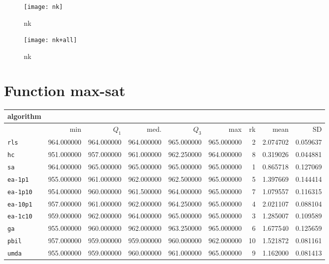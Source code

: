\begin{center}
\begin{figure}[h]
\centering
\texttt{[image: nk]}
\caption{nk}
\end{figure}
\end{center}

\begin{center}
\begin{figure}[h]
\centering
\texttt{[image: nk+all]}
\caption{nk}
\end{figure}
\end{center}

\newpage

\section{Function max-sat}
\begin{center}
\begin{tabular}{@{}l*{5}{>{{}}N{3}{0}}>{{}}N{2}{0}N{1}{3}N{1}{3}@{}}
\toprule
{algorithm} &  &  \\
\midrule
& {min} & {$Q_1$} & {med.} & {$Q_3$} & {max} & {rk} & {mean} & {SD} \\
\midrule
\verb|rls| & {\color{blue}} 964.000000 & 964.000000 & 964.000000 & {\color{blue}} 965.000000 & {\color{blue}} 965.000000 & 2 & 2.074702 & 0.059637 \\
 \verb|hc| & 951.000000 & 957.000000 & 961.000000 & 962.250000 & 964.000000 & 8 & 0.319026 & 0.044881 \\
 \verb|sa| & {\color{blue}} 964.000000 & {\color{blue}} 965.000000 & {\color{blue}} 965.000000 & {\color{blue}} 965.000000 & {\color{blue}} 965.000000 & 1 & 0.865718 & 0.127069 \\
 \verb|ea-1p1| & 955.000000 & 961.000000 & 962.000000 & 962.500000 & {\color{blue}} 965.000000 & 5 & 1.397669 & 0.144414 \\
 \verb|ea-1p10| & 954.000000 & 960.000000 & 961.500000 & 964.000000 & {\color{blue}} 965.000000 & 7 & 1.079557 & 0.116315 \\
 \verb|ea-10p1| & 957.000000 & 961.000000 & 962.000000 & 964.250000 & {\color{blue}} 965.000000 & 4 & 2.021107 & 0.088104 \\
 \verb|ea-1c10| & 959.000000 & 962.000000 & 964.000000 & {\color{blue}} 965.000000 & {\color{blue}} 965.000000 & 3 & 1.285007 & 0.109589 \\
 \verb|ga| & 955.000000 & 960.000000 & 962.000000 & 963.250000 & {\color{blue}} 965.000000 & 6 & 1.677540 & 0.125659 \\
 \verb|pbil| & 957.000000 & 959.000000 & 959.000000 & 960.000000 & 962.000000 & 10 & 1.521872 & 0.081161 \\
 \verb|umda| & 955.000000 & 959.000000 & 960.000000 & 961.000000 & {\color{blue}} 965.000000 & 9 & 1.162000 & 0.081413 \\
 \bottomrule
\end{tabular}
\end{center}

